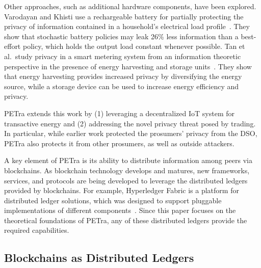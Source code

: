 Other approaches, such as additional hardware components, have been explored.
Varodayan and Khisti use a
rechargeable battery for partially protecting the privacy of
information contained in a household's electrical load
profile~\cite{varodayan2011smart}. They show that stochastic battery
policies may leak 26\% less information than a best-effort policy,
which holds the output load constant whenever possible. Tan et
al.\ study privacy in a smart metering system from an information
theoretic perspective in the presence of energy harvesting and storage
units~\cite{tan2013increasing}. They show that energy harvesting
provides increased privacy by diversifying the energy source, while a
storage device can be used to increase  energy efficiency and
privacy.

PETra extends this work by (1) leveraging a decentralized IoT
system for transactive energy and (2) addressing the novel privacy
threat posed by trading. In particular, while earlier work protected
the prosumers' privacy from the DSO, PETra also protects it from other
prosumers, as well as outside attackers.

A key element of PETra is its ability to distribute information among
peers via blockchains.  As blockchain technology develops and matures,
new frameworks, services, and protocols are being developed to
leverage the distributed ledgers provided by blockchains. For example,
Hyperledger Fabric is a platform for distributed ledger solutions,
which was designed to support pluggable implementations of different
components~\cite{hyperledger2017fabric}.
Since this paper focuses on the theoretical foundations of PETra, any
of these distributed ledgers provide the required capabilities.


\iffalse
\subsection{Blockchains as Distributed Ledgers}

